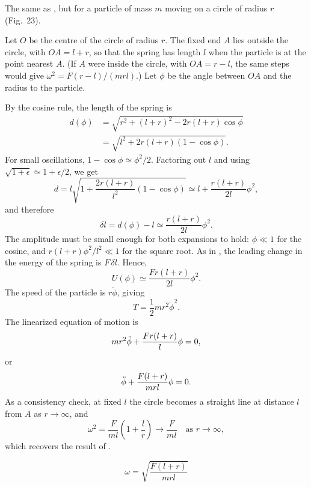 
\begin{problem}[title={Particle on a circle held by a spring}]
{
The same as , but for a particle of mass $m$ moving on a circle of radius $r$ (Fig.~23).
}
{
Let $O$ be the centre of the circle of radius $r$. The fixed end $A$ lies outside the circle, with $OA = l + r$, so that the spring has length $l$ when the particle is at the point nearest $A$. (If $A$ were inside the circle, with $OA = r - l$, the same steps would give $\omega^2 = F(r - l)/(mrl)$.) Let $\phi$ be the angle between $OA$ and the radius to the particle.

By the cosine rule, the length of the spring is
\begin{align*}
    d(\phi) &= \sqrt{r^2 + (l + r)^2 - 2r(l + r)\cos{\phi}} \\
    &= \sqrt{l^2 + 2r(l + r)(1 - \cos{\phi})}.
\end{align*}
For small oscillations, $1 - \cos{\phi} \simeq \phi^2/2$. Factoring out $l$ and using $\sqrt{1 + \epsilon} \simeq 1 + \epsilon/2$, we get
\begin{equation*}
    d = l\sqrt{1 + \frac{2r(l + r)}{l^2}(1 - \cos{\phi})} \simeq l + \frac{r(l + r)}{2l}\phi^2,
\end{equation*}
and therefore
\begin{equation*}
    \delta l = d(\phi) - l \simeq \frac{r(l + r)}{2l}\phi^2.
\end{equation*}
The amplitude must be small enough for both expansions to hold: $\phi \ll 1$ for the cosine, and $r(l + r)\phi^2/l^2 \ll 1$ for the square root.
As in , the leading change in the energy of the spring is $F\,\delta l$. Hence,
\begin{equation*}
    U(\phi) \simeq \frac{Fr(l + r)}{2l}\phi^2.
\end{equation*}
The speed of the particle is $r\Dot{\phi}$, giving
\begin{equation*}
    T = \frac{1}{2}mr^2\Dot{\phi}^2.
\end{equation*}
The linearized equation of motion is
\begin{equation*}
    mr^2\Ddot{\phi} + \frac{Fr(l + r)}{l}\phi = 0,
\end{equation*}
or
\begin{equation*}
    \Ddot{\phi} + \frac{F(l + r)}{mrl}\phi = 0.
\end{equation*}
As a consistency check, at fixed $l$ the circle becomes a straight line at distance $l$ from $A$ as $r \to \infty$, and
\begin{equation*}
    \omega^2 = \frac{F}{ml}\left(1 + \frac{l}{r}\right) \longrightarrow \frac{F}{ml} \quad \text{as } r \to \infty,
\end{equation*}
which recovers the result of .
}
{
\begin{equation*}
    \omega = \sqrt{\frac{F(l + r)}{mrl}}
\end{equation*}
}
\end{problem}

